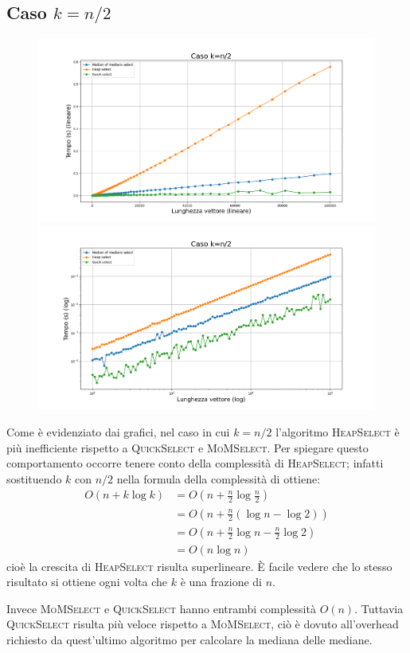 \documentclass[a4paper,12pt]{article}
\newcommand{\QuickSelect}{\textsc{QuickSelect}}
\newcommand{\HeapSelect}{\textsc{HeapSelect}}
\newcommand{\MoMSelect}{\textsc{MoMSelect}}
\begin{document}
\subsection{Caso $k=n/2$}
\begin{figure}[h]
            \centering
            \includegraphics[width=.83\textwidth]{graphs/k_const_n.png}
            \includegraphics[width=.83\textwidth]{graphs/k_const_2xlog.png}
\end{figure}
Come è evidenziato dai grafici, nel caso in cui $k=n/2$ l'algoritmo \HeapSelect{} è più inefficiente rispetto a \QuickSelect{} e \MoMSelect{}.
Per spiegare questo comportamento occorre tenere conto della complessità di \HeapSelect{}; infatti sostituendo $k$ con $n/2$ nella formula della complessità di ottiene:
\[\begin{split}
	O(n + k\log k) 	& = O\left(n + \frac{n}{2}\log \frac{n}{2}\right) \\
			& = O\left(n + \frac{n}{2}(\log n - \log 2)\right) \\
			& = O\left(n + \frac{n}{2}\log n - \frac{n}{2}\log 2\right) \\
			& = O(n \log n)
\end{split}\]
cioè la crescita di \HeapSelect{} risulta superlineare.
È facile vedere che lo stesso risultato si ottiene ogni volta che $k$ è una frazione di $n$.

Invece \MoMSelect{} e \QuickSelect{} hanno entrambi complessità $O(n)$.
Tuttavia \QuickSelect{} risulta più veloce rispetto a \MoMSelect{}, ciò è dovuto all'overhead richiesto da quest'ultimo algoritmo per calcolare la mediana delle mediane.
\end{document}
